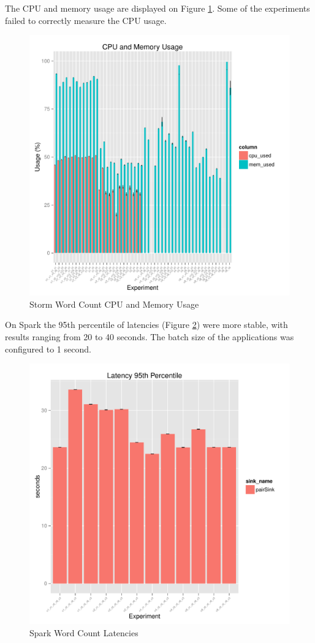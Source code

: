 \documentclass[ppgc,diss,english]{iiufrgs}
\begin{document}
The CPU and memory usage are displayed on Figure \ref{fig:storm_wordcount_cpu_mem}. Some of the experiments failed to correctly measure the CPU usage.

\begin{figure}[H]
    \centering
	\includegraphics[width=.6\textwidth]{summaries/storm_wordcount/full_cpu_mem.pdf}
	\caption{Storm Word Count CPU and Memory Usage}
	\label{fig:storm_wordcount_cpu_mem}
\end{figure}

On Spark the 95th percentile of latencies (Figure \ref{fig:spark_wordcount_latency}) were more stable, with results ranging from 20 to 40 seconds. The batch size of the applications was configured to 1 second.

\begin{figure}[H]
    \centering
	\includegraphics[width=.6\textwidth]{summaries/spark_wordcount/latency.pdf}
	\caption{Spark Word Count Latencies}
	\label{fig:spark_wordcount_latency}
\end{figure}
\end{document}
